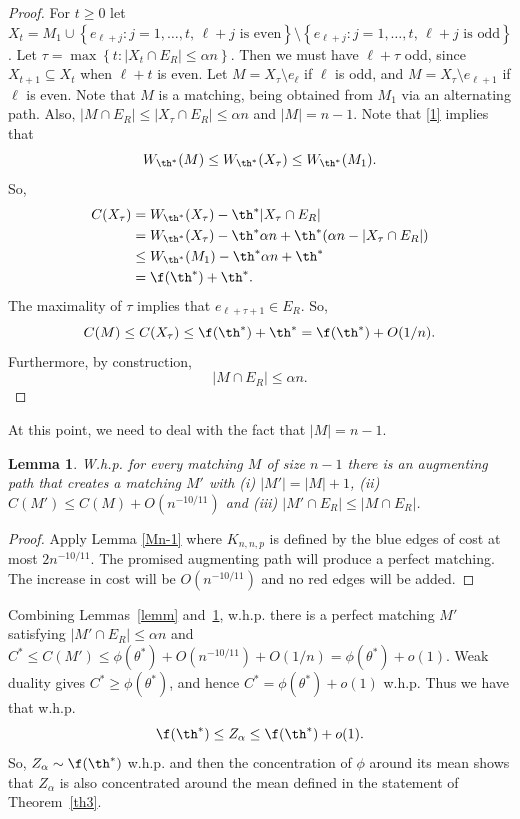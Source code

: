 \documentclass[12pt]{article}
\newcommand{\1}{\textbf{1}}
\def\a{\alpha} \def\b{\beta} \def\d{\delta} \def\D{\Delta}
\def\t{\tau} \def\om{\omega} \def\OM{\Omega} \def\Om{\Omega}\def\up{\upsilon}\def\U{\Upsilon}
\newtheorem{lemma}[theorem]{Lemma}
\newcommand{\set}[1]{\left\{#1\right\}}
\newcommand{\beq}[2]{\begin{equation}\label{#1}#2\end{equation}}
\begin{document}
\begin{proof}
For $t\geq 0$ let $X_t=M_1\cup \set{e_{\ell+j}:j=1, \ldots, t,\,\ell+j\text{ is even}}\setminus \set{e_{\ell+j}:j=1, \ldots, t,\,\ell+j\text{ is odd}}$. Let $\t=\max\set{t:|X_t\cap E_R|\leq \a n}$. Then we must have $\ell+\t$ odd, since $X_{t+1} \subseteq X_{t}$ when $\ell+t$ is even. Let $M= X_\t \setminus e_\ell$ if $\ell$ is odd, and $M= X_\t \setminus e_{\ell+1}$ if $\ell$ is even. Note that $M$ is a matching, being obtained from $M_1$ via an alternating path. Also, $|M\cap E_R|\leq |X_\t\cap E_R|\leq {\a n}$ and $|M|=n-1$. Note that \eqref{1} implies that 
\[
W_{\th^*}(M)\leq W_{\th^*}(X_\t)\leq W_{\th^*}(M_1).
\]
So,
\begin{align*}
C(X_\t)&=W_{\th^*}(X_\t)-\th^* |X_\t\cap E_R|\\
&=W_{\th^*}(X_\t)-\th^* {\a n}+\th^*({\a n}- |X_\t\cap E_R|) \\ 
&\leq W_{\th^*}(M_1)-\th^* {\a n}+\th^*\\
&=\f(\th^*)+\th^*.
\end{align*}
The maximality of $\t$ implies that $e_{\ell + \t + 1}\in E_R$. So,
\beq{up1}{
C(M)\leq C(X_\t)\leq \f(\th^*)+\th^*=\f(\th^*)+O(1/n).
}
Furthermore, by construction,
\beq{upC1}{
|M\cap E_R|\leq {\a n}.
}
\end{proof}
At this point, we need to deal with the fact that $|M|=n-1$. 
\begin{lemma}\label{Mn-1x}
W.h.p. for every matching $M$ of size $n-1$ there is an augmenting path that creates a matching $M'$ with (i) $|M'|=|M|+1$, (ii) $C(M')\leq C(M)+O(n^{-10/11})$ and (iii) $|M'\cap E_R|\leq|M\cap E_R|$.
\end{lemma}
\begin{proof}
Apply Lemma \ref{Mn-1} where $K_{n,n,p}$ is defined by the blue edges of cost at most $2n^{-10/11}$. The promised augmenting path will produce a perfect matching. The increase in cost will be $O(n^{-10/11})$ and no red edges will be added.
\end{proof}
Combining Lemmas~\ref{lemm} and~\ref{Mn-1x}, w.h.p. there is a perfect matching $M'$ satisfying $|M'\cap E_R|\le \alpha n$ and $C^*\leq C(M')\le \phi(\theta^*)+O(n^{-10/11})+O(1/n)=\phi(\theta^*)+o(1)$. Weak duality gives $C^*\ge \phi(\theta^*)$, and hence $C^*=\phi(\theta^*)+o(1)$ w.h.p.  Thus we have that w.h.p. 
\[
\f(\th^*)\leq Z_\a\leq \f(\th^*)+o(1).
\]
So, $Z_\a\sim \f(\th^*)$ w.h.p. and then the concentration of $\phi$ around its mean shows that $Z_\a$ is also concentrated around the mean defined in the statement of Theorem~\ref{th3}.
\end{document}
